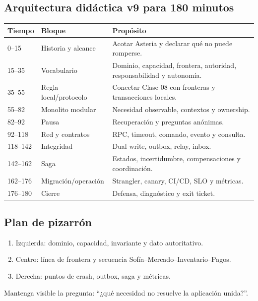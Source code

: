 \documentclass[variant=docente,cover=institutional,mode=screen]{ua-engineering-v6-article}
\begin{document}
\subsection{Arquitectura didáctica v9 para 180 minutos}
\begin{center}
\begin{tabular}{p{}p{}p{}}
\toprule
\textbf{Tiempo} & \textbf{Bloque} & \textbf{Propósito} \\
\midrule
0--15 & Historia y alcance & Acotar Asteria y declarar qué no puede romperse. \\
15--35 & Vocabulario & Dominio, capacidad, frontera, autoridad, responsabilidad y autonomía. \\
35--55 & Regla local/protocolo & Conectar Clase 08 con fronteras y transacciones locales. \\
55--82 & Monolito modular & Necesidad observable, contextos y ownership. \\
82--92 & Pausa & Recuperación y preguntas anónimas. \\
92--118 & Red y contratos & RPC, timeout, comando, evento y consulta. \\
118--142 & Integridad & Dual write, outbox, relay, inbox. \\
142--162 & Saga & Estados, incertidumbre, compensaciones y coordinación. \\
162--176 & Migración/operación & Strangler, canary, CI/CD, SLO y métricas. \\
176--180 & Cierre & Defensa, diagnóstico y exit ticket. \\
\bottomrule
\end{tabular}
\end{center}

\subsection{Plan de pizarrón}
\begin{enumerate}
\item Izquierda: dominio, capacidad, invariante y dato autoritativo.
\item Centro: línea de frontera y secuencia Sofía--Mercado--Inventario--Pagos.
\item Derecha: puntos de crash, outbox, saga y métricas.
\end{enumerate}
Mantenga visible la pregunta: ``¿qué necesidad no resuelve la aplicación unida?''.
\end{document}
